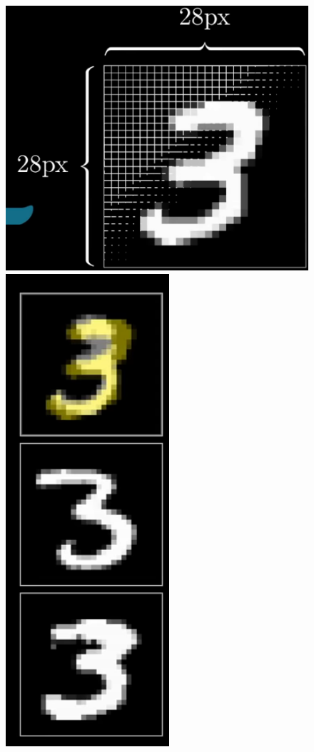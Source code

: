 \documentclass[10pt]{beamer}
\begin{document}
\begin{frame}
\begin{columns}
\begin{column}{.5\textwidth}
 \begin{figure}
 \vspace{-10mm}
 \includegraphics[scale=0.15]{./Figures/tres_pixel.png}
 \hspace{10mm}
 \includegraphics[scale=0.2]{./Figures/tres_pixel_2.png}  
 \end{figure}  
\end{column}%
\end{columns}

\end{frame}
\end{document}

